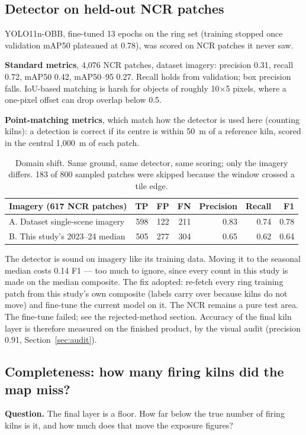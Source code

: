 \documentclass[11pt,a4paper]{article}
\begin{document}
\subsection{Detector on held-out NCR patches}
YOLO11n-OBB, fine-tuned 13 epochs on the ring set (training stopped once
validation mAP50 plateaued at 0.78), was scored on NCR patches it never saw.

\textbf{Standard metrics}, 4{,}076 NCR patches, dataset imagery: precision 0.31,
recall 0.72, mAP50 0.42, mAP50--95 0.27. Recall holds from validation; box
precision falls. IoU-based matching is harsh for objects of roughly 10$\times$5
pixels, where a one-pixel offset can drop overlap below 0.5.

\textbf{Point-matching metrics}, which match how the detector is used here
(counting kilns): a detection is correct if its centre is within 50~m of a
reference kiln, scored in the central 1{,}000~m of each patch.

\begin{table}[H]
\centering\small
\begin{tabular}{@{}lrrrrrr@{}}
\toprule
Imagery (617 NCR patches) & TP & FP & FN & Precision & Recall & F1 \\
\midrule
A. Dataset single-scene imagery & 598 & 122 & 211 & 0.83 & 0.74 & 0.78 \\
B. This study's 2023--24 median  & 505 & 277 & 304 & 0.65 & 0.62 & 0.64 \\
\bottomrule
\end{tabular}
\caption{Domain shift. Same ground, same detector, same scoring; only the
imagery differs. 183 of 800 sampled patches were skipped because the window
crossed a tile edge.}
\end{table}

The detector is sound on imagery like its training data. Moving it to the
seasonal median costs 0.14 F1 --- too much to ignore, since every count in this
study is made on the median composite. The fix adopted: re-fetch every ring
training patch from this study's own composite (labels carry over because
kilns do not move) and fine-tune the current model on it. The NCR remains a
pure test area. The fine-tune failed; see the rejected-method section.
Accuracy of the final kiln layer is therefore measured on the finished product,
by the visual audit (precision 0.91, Section~\ref{sec:audit}).

\subsection{Completeness: how many firing kilns did the map miss?}\label{sec:completeness}
\textbf{Question.} The final layer is a floor. How far below the true number of
firing kilns is it, and how much does that move the exposure figures?
\end{document}

